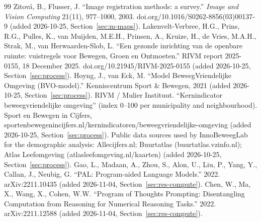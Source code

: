 \begin{thebibliography}{99}
 Zitov\'a, B., Flusser, J. \textquotedblleft{}Image registration methods: a survey.\textquotedblright{} \textit{Image and Vision Computing} 21(11), 977--1000, 2003. doi.org/10.1016/S0262-8856(03)00137-9 (added 2026-10-25, Section~\ref{sec:m-maps}).
 Lakenvelt-Verbree, H.G., Prins, R.G., Pulles, K., van Muijden, M.E.H., Prinsen, A., Kruize, H., de Vries, M.A.H., Strak, M., van Herwaarden-Slob, L. \textquotedblleft{}Een gezonde inrichting van de openbare ruimte: vuistregels voor Bewegen, Groen en Ontmoeten.\textquotedblright{} RIVM report 2025-0155, 18 December 2025. doi.org/10.21945/RIVM-2025-0155 (added 2026-10-25, Section~\ref{sec:process}).
 Hoyng, J., van Eck, M. \textquotedblleft{}Model BeweegVriendelijke Omgeving (BVO-model).\textquotedblright{} Kenniscentrum Sport \& Bewegen, 2021 (added 2026-10-25, Section~\ref{sec:process}).
 RIVM / Mulier Instituut. \textquotedblleft{}Kernindicator beweegvriendelijke omgeving\textquotedblright{} (index 0--100 per municipality and neighbourhood). Sport en Bewegen in Cijfers, sportenbewegenincijfers.nl/kernindicatoren/beweegvriendelijke-omgeving (added 2026-10-25, Section~\ref{sec:process}).
 Public data sources used by InnoBeweegLab for the demographic analysis: Allecijfers.nl; Buurtatlas (buurtatlas.vzinfo.nl); Atlas Leefomgeving (atlasleefomgeving.nl/kaarten) (added 2026-10-25, Section~\ref{sec:process}).
 Gao, L., Madaan, A., Zhou, S., Alon, U., Liu, P., Yang, Y., Callan, J., Neubig, G. \textquotedblleft{}PAL: Program-aided Language Models.\textquotedblright{} 2022. arXiv:2211.10435 (added 2026-11-04, Section~\ref{sec:res-compute}).
 Chen, W., Ma, X., Wang, X., Cohen, W.W. \textquotedblleft{}Program of Thoughts Prompting: Disentangling Computation from Reasoning for Numerical Reasoning Tasks.\textquotedblright{} 2022. arXiv:2211.12588 (added 2026-11-04, Section~\ref{sec:res-compute}).
\end{thebibliography}

